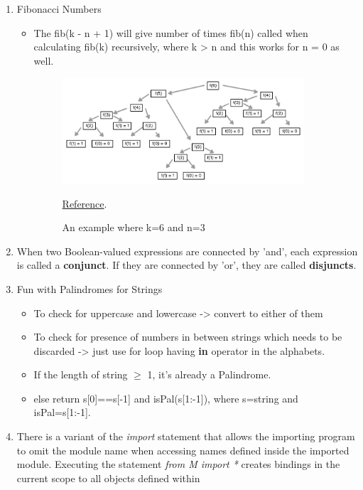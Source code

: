 \documentclass[11pt]{article}
\begin{document}
\begin{enumerate}
        \item Fibonacci Numbers
        \begin{itemize}
            \item The fib(k - n + 1) will give number of times fib(n) called when calculating fib(k) recursively, where k > n and this works for n = 0 as well.
            \begin{figure}[htp]
                \centering
                \includegraphics[width=9cm]{imgs/ex1.jpg}
                \caption{An example where k=6 and n=3} \href{https://stackoverflow.com/questions/63136225/how-many-times-does-fib3-gets-called-when-we-call-fib6-using-the-recursive-a}{Reference}.
                \label{fig:galaxy}
            \end{figure}
        \end{itemize}
        \item When two Boolean-valued expressions are connected by 'and', each expression is called a \textbf{conjunct}. If they are connected by 'or', they are called \textbf{disjuncts}.
        \item Fun with Palindromes for Strings
        \begin{itemize}
            \item To check for uppercase and lowercase -> convert to either of them
            \item To check for presence of numbers in between strings which needs to be discarded -> just use for loop having \textbf{in} operator in the alphabets.
            \item If the length of string $\geq$ 1, it's already a Palindrome.
            \item else return s[0]==s[-1] and isPal(s[1:-1]), where s=string and isPal=s[1:-1].
        \end{itemize}
        \item There is a variant of the \textit{import} statement that allows the importing program to omit the module name when accessing names defined inside the imported module. Executing the statement \textit{from M import *} creates bindings in the current scope to all objects defined within 

\end{enumerate}
\end{document}
